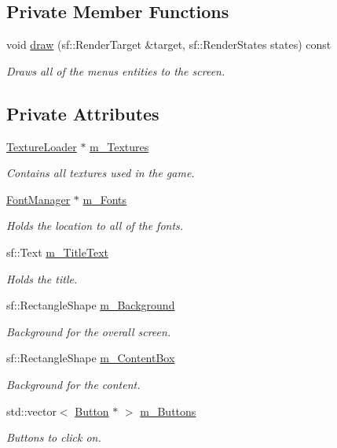 \subsection*{Private Member Functions}
\begin{DoxyCompactItemize}
\item 
void \hyperlink{class_menu_aa0e69963ee402f3559680e5a691b03fd}{draw} (sf\+::\+Render\+Target \&target, sf\+::\+Render\+States states) const
\begin{DoxyCompactList}\small\item\em Draws all of the menu\textquotesingle{}s entities to the screen. \end{DoxyCompactList}\end{DoxyCompactItemize}
\subsection*{Private Attributes}
\begin{DoxyCompactItemize}
\item 
\hyperlink{class_texture_loader}{Texture\+Loader} $\ast$ \hyperlink{class_menu_a05b6e122a40964ee105c2519f8593659}{m\+\_\+\+Textures}
\begin{DoxyCompactList}\small\item\em Contains all textures used in the game. \end{DoxyCompactList}\item 
\hyperlink{class_font_manager}{Font\+Manager} $\ast$ \hyperlink{class_menu_ac973d7706422e159a9447fa0655d2666}{m\+\_\+\+Fonts}
\begin{DoxyCompactList}\small\item\em Holds the location to all of the fonts. \end{DoxyCompactList}\item 
sf\+::\+Text \hyperlink{class_menu_a80fcab309ad59f745961adaabf689372}{m\+\_\+\+Title\+Text}
\begin{DoxyCompactList}\small\item\em Holds the title. \end{DoxyCompactList}\item 
sf\+::\+Rectangle\+Shape \hyperlink{class_menu_a286029cece23aec0264441cdbc55e150}{m\+\_\+\+Background}
\begin{DoxyCompactList}\small\item\em Background for the overall screen. \end{DoxyCompactList}\item 
sf\+::\+Rectangle\+Shape \hyperlink{class_menu_a963e1ea48fad891a3f96e98d97616dd2}{m\+\_\+\+Content\+Box}
\begin{DoxyCompactList}\small\item\em Background for the content. \end{DoxyCompactList}\item 
std\+::vector$<$ \hyperlink{class_button}{Button} $\ast$ $>$ \hyperlink{class_menu_ac32ce970534165a8fba07c28195c06bf}{m\+\_\+\+Buttons}
\begin{DoxyCompactList}\small\item\em Buttons to click on. \end{DoxyCompactList}\end{DoxyCompactItemize}



